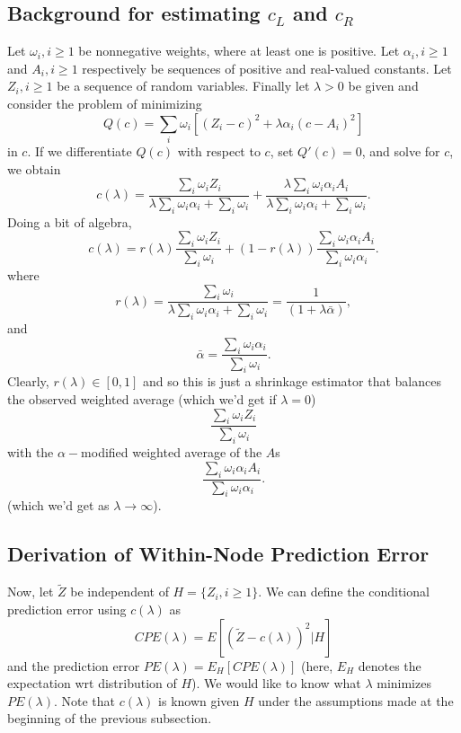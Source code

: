 \documentclass[12pt]{article}
\begin{document}
\subsection{Background for estimating $c_L$ and $c_R$}
\label{Est}
Let $\omega_i, i \geq 1$ be nonnegative weights, where at least one is
positive. Let $\alpha_i, i \geq 1$ and $A_i, i \geq 1$ respectively be
sequences of positive and real-valued constants. Let $Z_i, i \geq 1$
be a sequence of random variables. Finally let $\lambda > 0$ be given
and consider the problem of minimizing
\[
Q(c) = {\textstyle \sum\nolimits}_i \omega_i \left[ (Z_{i}-c)^2 + \lambda \alpha_i (c-A_i)^2 \right]
\]
in $c$.  If we differentiate $Q(c)$ with respect to $c$, set $Q'(c) = 0$, and solve for $c$, we obtain
\[
c(\lambda) = \frac{\sum_i \omega_i Z_i}{\lambda \sum_i \omega_i \alpha_i + \sum_i \omega_i}
+  \frac{ \lambda \sum_i \omega_i \alpha_i A_i}{\lambda \sum_i \omega_i \alpha_i + \sum_i \omega_i}.
\]
Doing a bit of algebra,
\begin{equation}
\label{clambda}
c(\lambda) = r(\lambda) \frac{\sum_i \omega_i Z_i}{\sum_i \omega_i}
+  (1-r(\lambda)) \frac{ \sum_i \omega_i \alpha_i A_i}{ \sum_i \omega_i \alpha_i }.
\end{equation}
where
\begin{equation}
\label{rlambda}
r(\lambda) = \frac{\sum_i \omega_i}{\lambda \sum_i \omega_i \alpha_i + \sum_i \omega_i}  = 
\frac{1}{(1 + \lambda \bar{\alpha})},
\end{equation}
and
\begin{equation}
\label{baralpha}
 \bar{\alpha} = \frac{\sum_i \omega_i \alpha_i}{\sum_i \omega_i}.
\end{equation}
Clearly, $r(\lambda) \in [0,1]$ and so this is just a shrinkage
estimator that balances the observed weighted average (which we'd get
if $\lambda = 0$)
\[
 \frac{\sum_i \omega_i Z_i}{\sum_i \omega_i}
\]
with the $\alpha-$modified weighted average of the $A$s
\[
\frac{ \sum_i \omega_i \alpha_i A_i}{ \sum_i \omega_i \alpha_i }.
\]
(which we'd get as $\lambda \rightarrow \infty$).

\subsection{Derivation of Within-Node Prediction Error}
\label{PE}
Now, let $\tilde{Z}$ be independent of $H = \{Z_i, i \geq 1\}.$ We can
define the conditional prediction error using $c(\lambda)$ as
\[
CPE(\lambda) = E\left[ (\tilde Z - c(\lambda))^2 | H \right]
\] 
and the prediction error $PE(\lambda) = E_H\left[ CPE(\lambda)
  \right]$ (here, $E_H$ denotes the expectation wrt distribution of
$H$).  We would like to know what $\lambda$ minimizes
$PE(\lambda)$. Note that $c(\lambda)$ is known given $H$ under the
assumptions made at the beginning of the previous subsection.
\end{document}
